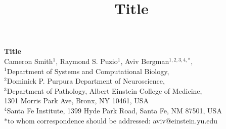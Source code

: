 




\let\ref\autoref


\title{Title}

\begin{center}
{\Large
\textbf{Title}
}
\\[.5cm]
Cameron Smith$^{1}$,
Raymond S. Puzio$^{1}$,
Aviv Bergman$^{1,2,3,4,*}$,
\\[.5cm]
$^1$Department of Systems and Computational Biology,\\
$^2$Dominick P. Purpura Department of Neuroscience,\\
$^3$Department of Pathology, Albert Einstein College of Medicine,\\
1301 Morris Park Ave, Bronx, NY 10461, USA\\
$^4$Santa Fe Institute, 1399 Hyde Park Road, Santa Fe, NM 87501, USA
\\
$*$to whom correspondence should be addressed: aviv@einstein.yu.edu\\[.5cm]
\end{center}


